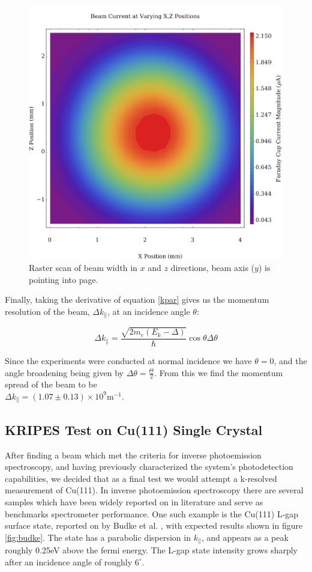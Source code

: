 \clearpage
\begin{figure}[h!]
    \centering
    \includegraphics[width=0.85\linewidth]{../Beam Divergence/Plots/Raster plot.png}
	\caption{Raster scan of beam width in $x$ and $z$ directions, beam axis ($y$) is pointing into page.}
    \label{fig:raster}
\end{figure}

Finally, taking the derivative of equation \eqref{kpar} gives us the momentum resolution of the beam, $\Delta k_\parallel$, at an incidence angle $\theta$:

\begin{equation}
	\Delta k_\parallel = \frac{\sqrt{2m_e(E_k-\Delta)}}{\hbar}\cos\theta \Delta\theta
\end{equation}

Since the experiments were conducted at normal incidence we have $\theta=0$, and the angle broadening being given by $\Delta\theta = \frac{\Theta}{2}$.
From this we find the momentum spread of the beam to be\\$\Delta k_\parallel = (1.07\pm0.13)\times10^9\mathrm{m}^{-1}$.  

\subsection{KRIPES Test on Cu(111) Single Crystal}

After finding a beam which met the criteria for inverse photoemission spectroscopy, and having previously characterized the system's photodetection
capabilities, we decided that as a final test we would attempt a k-resolved measurement of Cu(111). In inverse photoemission spectroscopy there 
are several samples which have been widely reported on in literature and serve as benchmarks spectrometer performance. One such example is the 
Cu(111) L-gap surface state, reported on by Budke et al. \cite{budke}, with expected results shown in figure \ref{fig:budke}. The state has a parabolic 
dispersion in $k_\parallel$, and appears as a peak roughly 0.25eV above the fermi energy. The L-gap state intensity grows sharply after an incidence angle 
of roughly $6^\circ$. 

